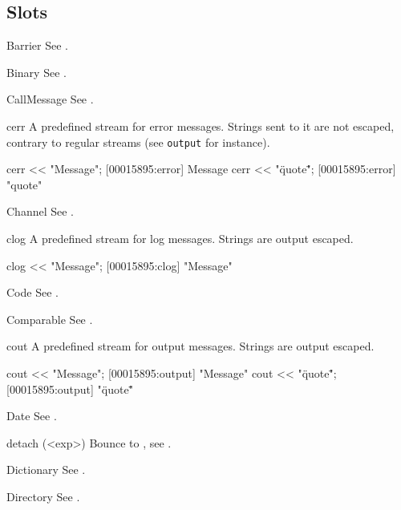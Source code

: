 \subsection{Slots}
\begin{urbiscriptapi}
\item[Barrier] See .


\item[Binary] See .


\item[CallMessage] See .


\item[cerr] A predefined stream for error messages.  Strings sent to
  it are not escaped, contrary to regular streams (see
  \lstinline|output| for instance).
\begin{urbiscript}
cerr << "Message";
[00015895:error] Message
cerr << "\"quote\"";
[00015895:error] "quote"
\end{urbiscript}


\item[Channel] See .


\item[clog] A predefined stream for log messages.  Strings are output
  escaped.
\begin{urbiscript}
clog << "Message";
[00015895:clog] "Message"
\end{urbiscript}


\item[Code] See .


\item[Comparable] See .


\item[cout] A predefined stream for output messages.  Strings are
  output escaped.
\begin{urbiscript}
cout << "Message";
[00015895:output] "Message"
cout << "\"quote\"";
[00015895:output] "\"quote\""
\end{urbiscript}


\item[Date] See .


\item[detach](<exp>)%
  Bounce to , see .


\item[Dictionary] See .


\item[Directory] See .



\end{urbiscriptapi}

